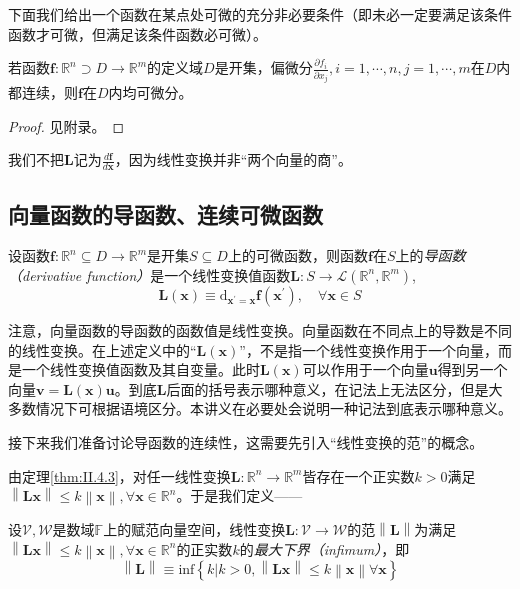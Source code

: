 \documentclass[main.tex]{subfiles}
\begin{document}
下面我们给出一个函数在某点处可微的充分非必要条件（即未必一定要满足该条件函数才可微，但满足该条件函数必可微）\cite[“例3”,p.~23]{华工高数2009下}。

\begin{theorem}\label{thm:II.4.9}
    若函数$\mathbf{f}:\mathbb{R}^n\supset D\rightarrow\mathbb{R}^m$的定义域$D$是开集，偏微分$\frac{\partial f_i}{\partial x_j},i=1,\cdots,n,j=1,\cdots,m$在$D$内都连续，则$\mathbf{f}$在$D$内均可微分。
\end{theorem}
\begin{proof}
    见附录。
\end{proof}

我们不把$\mathbf{L}$记为$\frac{d\mathbf{f}}{d\mathbf{x}}$，因为线性变换并非“两个向量的商”。

\subsection{向量函数的导函数、连续可微函数}
\begin{definition}[向量函数的导函数]\label{def:II.4.15}
    设函数$\mathbf{f}:\mathbb{R}^n\subseteq D\rightarrow\mathbb{R}^m$是开集$S\subseteq D$上的可微函数，则函数$\mathbf{f}$在$S$上的\emph{导函数（derivative function）}是一个线性变换值函数$\mathbf{L}:S\rightarrow\mathcal{L}\left(\mathbb{R}^n,\mathbb{R}^m\right)$,
    \[\mathbf{L}\left(\mathbf{x}\right)\equiv \mathrm{d}_{\mathbf{x}^\prime=\mathbf{x}}\mathbf{f}\left(\mathbf{x}^\prime\right),\quad\forall\mathbf{x}\in S\]
\end{definition}

注意，向量函数的导函数的函数值是线性变换。向量函数在不同点上的导数是不同的线性变换。在上述定义中的“$\mathbf{L}\left(\mathbf{x}\right)$”，不是指一个线性变换作用于一个向量，而是一个线性变换值函数及其自变量。此时$\mathbf{L}\left(\mathbf{x}\right)$可以作用于一个向量$\mathbf{u}$得到另一个向量$\mathbf{v}=\mathbf{L}\left(\mathbf{x}\right)\mathbf{u}$。到底$\mathbf{L}$后面的括号表示哪种意义，在记法上无法区分，但是大多数情况下可根据语境区分。本讲义在必要处会说明一种记法到底表示哪种意义。

接下来我们准备讨论导函数的连续性，这需要先引入“线性变换的范”的概念。

由定理\ref{thm:II.4.3}，对任一线性变换$\mathbf{L}:\mathbb{R}^n\rightarrow\mathbb{R}^m$皆存在一个正实数$k>0$满足$\left\|\mathbf{Lx}\right\|\leq k\left\|\mathbf{x}\right\|,\forall\mathbf{x}\in\mathbb{R}^n$。于是我们定义——
\begin{definition}[线性变换的范]\label{def:II.4.16}
    设$\mathcal{V},\mathcal{W}$是数域$\mathbb{F}$上的赋范向量空间，线性变换$\mathbf{L}:\mathcal{V}\rightarrow\mathcal{W}$的范$\left\|\mathbf{L}\right\|$为满足$\left\|\mathbf{Lx}\right\|\leq k\left\|\mathbf{x}\right\|,\forall\mathbf{x}\in\mathbb{R}^n$的正实数$k$的\emph{最大下界（infimum）}，即
    \[\left\|\mathbf{L}\right\|\equiv\mathrm{inf}\left\{k|k>0,\left\|\mathbf{Lx}\right\|\leq k\left\|\mathbf{x}\right\|\forall\mathbf{x}\right\}\]
\end{definition}
\end{document}
